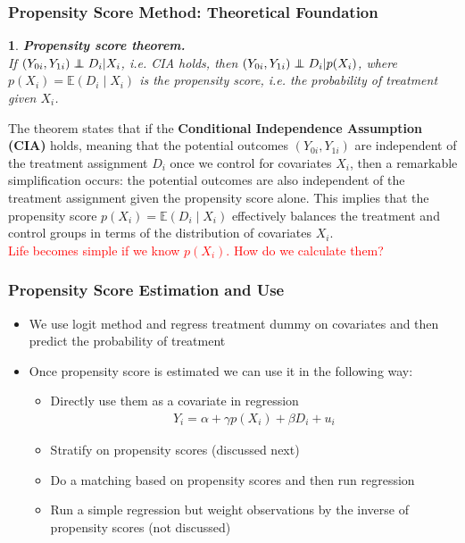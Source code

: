 \documentclass{beamer}
\theoremstyle{plain}
\newtheorem*{customthm}{} %
\newcommand{\customtheorem}[2]{
	\begin{customthm}
		\textbf{#1.} #2
	\end{customthm}
}
\newcommand\independent{\protect\mathpalette{\protect\independenT}{\perp}}
\def\independenT#1#2{\mathrel{\rlap{$#1#2$}\mkern2mu{#1#2}}}
\begin{document}
\begin{frame}
	\frametitle{Propensity Score Method: Theoretical Foundation}
	\customtheorem{Propensity score theorem}{ \\If $\left(Y_{0i}, Y_{1i}\right) \independent D_i | X_i$, i.e. CIA holds, then $\left(Y_{0i}, Y_{1i}\right) \independent D_i | p(X_i)$, where $p(X_i) =\mathbb E(D_i\mid X_i)$ is the propensity score, i.e. the probability of treatment given $X_i$.}
	\pause
	The theorem states that if the \textbf{Conditional Independence Assumption (CIA)} holds, meaning that the potential outcomes \( (Y_{0i}, Y_{1i}) \) are independent of the treatment assignment \( D_i \) once we control for covariates \( X_i \), then a remarkable simplification occurs: the potential outcomes are also independent of the treatment assignment given the propensity score alone. This implies that the propensity score \( p(X_i) = \mathbb{E}(D_i \mid X_i) \) effectively balances the treatment and control groups in terms of the distribution of covariates \( X_i \).\\
	\pause
	\textcolor{red}{Life becomes simple if we know $p(X_i)$. How do we calculate them?}
	
\end{frame}

\begin{frame}
	\frametitle{Propensity Score Estimation and Use}
	\begin{itemize}
		\item We use logit method and regress treatment dummy on covariates and then predict the probability of treatment
		\item Once propensity  score is estimated we can use it in the following way:
			\begin{itemize}
				\item Directly use them as a covariate in regression
					\begin{align*}
						Y_i = \alpha + \gamma p(X_i) + \beta D_i + u_i
					\end{align*}
				\item Stratify on propensity scores (discussed next)
				\item Do a matching based on propensity scores and then run regression
				\item Run a simple regression but weight observations by the inverse of propensity scores (not discussed)
			\end{itemize}
	\end{itemize}
\end{frame}
\end{document}
